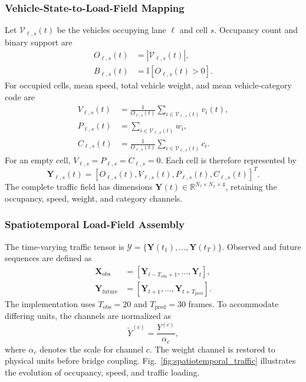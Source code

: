 \documentclass[journal]{IEEEtran}
\newcommand{\mathbfcal}[1]{\boldsymbol{\mathcal{#1}}}
\begin{document}
\subsubsection{Vehicle-State-to-Load-Field Mapping}
\label{subsec:load_field_mapping}
Let $\mathcal{V}_{\ell,s}(t)$ be the vehicles occupying lane $\ell$ and cell $s$. Occupancy count and binary support are
\begin{align}
O_{\ell,s}(t)&=|\mathcal{V}_{\ell,s}(t)|,
\label{eq:cell_occupancy}\\
B_{\ell,s}(t)&=\mathbb{I}[O_{\ell,s}(t)>0].
\label{eq:binary_occupancy}
\end{align}
For occupied cells, mean speed, total vehicle weight, and mean vehicle-category code are
\begin{align}
V_{\ell,s}(t)&=\frac{1}{O_{\ell,s}(t)}
\sum_{i\in\mathcal{V}_{\ell,s}(t)}v_i(t),
\label{eq:mean_vehicle_speed}\\
P_{\ell,s}(t)&=\sum_{i\in\mathcal{V}_{\ell,s}(t)}w_i,
\label{eq:cell_load}\\
C_{\ell,s}(t)&=\frac{1}{O_{\ell,s}(t)}
\sum_{i\in\mathcal{V}_{\ell,s}(t)}c_i.
\label{eq:mean_vehicle_type}
\end{align}
For an empty cell, $V_{\ell,s}=P_{\ell,s}=C_{\ell,s}=0$. Each cell is therefore represented by
\begin{equation}
\mathbf{Y}_{\ell,s}(t)=
[O_{\ell,s}(t),V_{\ell,s}(t),
P_{\ell,s}(t),C_{\ell,s}(t)]^T.
\label{eq:lane_cell_state}
\end{equation}
The complete traffic field has dimensions
$\mathbf{Y}(t)\in\mathbb{R}^{N_\ell\times N_x\times4}$, retaining the occupancy, speed, weight, and category channels.

\subsubsection{Spatiotemporal Load-Field Assembly}
\label{subsec:spatiotemporal_field}
The time-varying traffic tensor is
$\mathbfcal{Y}=\{\mathbf{Y}(t_1),\ldots,\mathbf{Y}(t_T)\}$.
Observed and future sequences are defined as
\begin{align}
\mathbf{X}_{\mathrm{obs}}&=
[\mathbf{Y}_{t-T_{\mathrm{obs}}+1},\ldots,\mathbf{Y}_t],
\label{eq:observed_sequence}\\
\mathbf{Y}_{\mathrm{future}}&=
[\mathbf{Y}_{t+1},\ldots,\mathbf{Y}_{t+T_{\mathrm{pred}}}].
\label{eq:future_sequence}
\end{align}
The implementation uses $T_{\mathrm{obs}}=20$ and $T_{\mathrm{pred}}=30$ frames. To accommodate differing units, the channels are normalized as
\begin{equation}
\widetilde{Y}^{(c)}=\frac{Y^{(c)}}{\alpha_c},
\label{eq:channel_normalization}
\end{equation}
where $\alpha_c$ denotes the scale for channel $c$. The weight channel is restored to physical units before bridge coupling. Fig.~\ref{fig:spatiotemporal_traffic} illustrates the evolution of occupancy, speed, and traffic loading.
\end{document}
